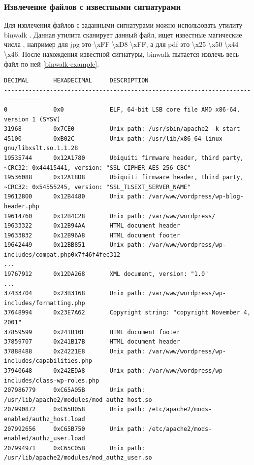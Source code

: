 \documentclass[20pt]{article}
\begin{document}
\subsubsection{Извлечение файлов с известными сигнатурами}

Для извлечения файлов с заданными сигнатурами можно использовать утилиту
binwalk \cite{binwalk}. Данная утилита сканирует данный файл, ищет известные
магические числа \cite{signatures}, например для jpg это \textbackslash xFF
\textbackslash xD8 \textbackslash xFF, а для pdf это \textbackslash x25
\textbackslash x50 \textbackslash x44 \textbackslash x46. После нахождения
известной сигнатуры, binwalk пытается извлечь весь файл по ней \ref{binwalk-example}.

\begin{lstlisting}[caption={Пример работы binwalk на дампе памяти},label={binwalk-example}]
DECIMAL       HEXADECIMAL     DESCRIPTION
--------------------------------------------------------------------------------
0             0x0             ELF, 64-bit LSB core file AMD x86-64, version 1 (SYSV)
31968         0x7CE0          Unix path: /usr/sbin/apache2 -k start
45100         0xB02C          Unix path: /usr/lib/x86_64-linux-gnu/libxslt.so.1.1.28
19535744      0x12A1780       Ubiquiti firmware header, third party, ~CRC32: 0x44415441, version: "SSL_CIPHER_AES_256_CBC"
19536088      0x12A18D8       Ubiquiti firmware header, third party, ~CRC32: 0x54555245, version: "SSL_TLSEXT_SERVER_NAME"
19612800      0x12B4480       Unix path: /var/www/wordpress/wp-blog-header.php
19614760      0x12B4C28       Unix path: /var/www/wordpress/
19633322      0x12B94AA       HTML document header
19633832      0x12B96A8       HTML document footer
19642449      0x12BB851       Unix path: /var/www/wordpress/wp-includes/compat.php0x7f46f4fec312
...
19767912      0x12DA268       XML document, version: "1.0"
...
37433704      0x23B3168       Unix path: /var/www/wordpress/wp-includes/formatting.php
37648994      0x23E7A62       Copyright string: "copyright November 4, 2001"
37859599      0x241B10F       HTML document footer
37859707      0x241B17B       HTML document header
37888488      0x24221E8       Unix path: /var/www/wordpress/wp-includes/capabilities.php
37940648      0x242EDA8       Unix path: /var/www/wordpress/wp-includes/class-wp-roles.php
207986779     0xC65A05B       Unix path: /usr/lib/apache2/modules/mod_authz_host.so
207990872     0xC65B058       Unix path: /etc/apache2/mods-enabled/authz_host.load
207992656     0xC65B750       Unix path: /etc/apache2/mods-enabled/authz_user.load
207994971     0xC65C05B       Unix path: /usr/lib/apache2/modules/mod_authz_user.so
\end{lstlisting}
\end{document}
